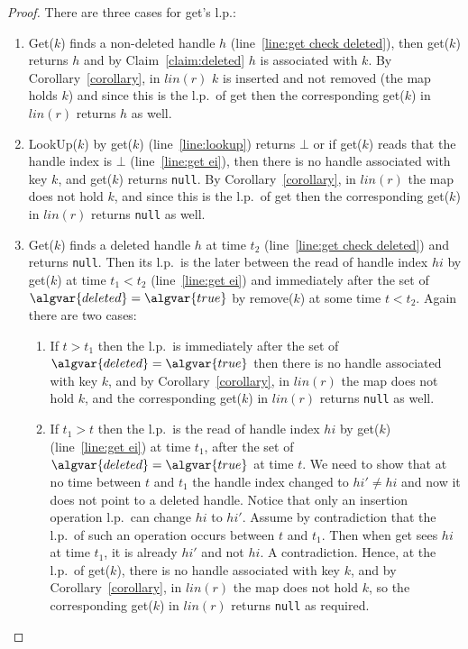 \begin{proof}
There are three cases for get's l.p.:
\begin{enumerate}
\item Get($k$) finds a non-deleted handle $h$ (line~\ref{line:get check deleted}), then get($k$) returns $h$ and by Claim~\ref{claim:deleted} $h$ is associated with $k$. 
By Corollary~\ref{corollary}, in $lin(r)$ $k$ is inserted and not removed (the map holds $k$) and since this is the l.p.\ of get then the corresponding get($k$) in $lin(r)$ returns $h$ as well.
\item LookUp($k$) by get($k$) (line~\ref{line:lookup}) returns $\bot$ or if get($k$) reads that the handle index is $\bot$ (line~\ref{line:get ei}), then there is no handle associated with key $k$, and get($k$) returns \texttt{null}.
By Corollary~\ref{corollary}, in $lin(r)$ the map does not hold $k$, and since this is the l.p.\ of get then the corresponding get($k$) in $lin(r)$ returns \texttt{null} as well.
\item Get($k$) finds a deleted handle $h$ at time $t_2$ (line~\ref{line:get check deleted}) and returns \texttt{null}.
Then its l.p.\ is the later between the read of handle index $hi$ by get($k$) at time $t_1 < t_2$ (line~\ref{line:get ei}) and immediately after the set of  $\algvar{deleted}=\algvar{true}$ by remove($k$) at some time $t < t_2$.
Again there are two cases:
\begin{enumerate}
\item If $t > t_1$ then the l.p.\ is immediately after the set of  $\algvar{deleted}=\algvar{true}$ then there is no handle associated with key $k$, and by  Corollary~\ref{corollary}, in $lin(r)$ the map does not hold $k$, and the corresponding get($k$) in $lin(r)$ returns \texttt{null} as well.
\item If $t_1 > t$ then the l.p.\ is the read of handle index $hi$ by get($k$) (line~\ref{line:get ei}) at time $t_1$, after the set of $\algvar{deleted}=\algvar{true}$ at time $t$.
We need to show that at no time between $t$ and $t_1$ the handle index changed to $hi' \neq hi$ and now it does not point to a deleted handle.
Notice that only an insertion operation l.p.\ can change $hi$ to $hi'$.
Assume by contradiction that the l.p.\ of such an operation occurs between $t$ and $t_1$.
Then when get sees $hi$ at time $t_1$, it is already $hi'$ and not $hi$. A contradiction.
Hence, at the l.p.\ of get($k$), there is no handle associated with key $k$, and by Corollary~\ref{corollary}, in $lin(r)$ the map does not hold $k$, so the corresponding get($k$) in $lin(r)$ returns \texttt{null} as required.
\end{enumerate}
\end{enumerate}
\end{proof}


